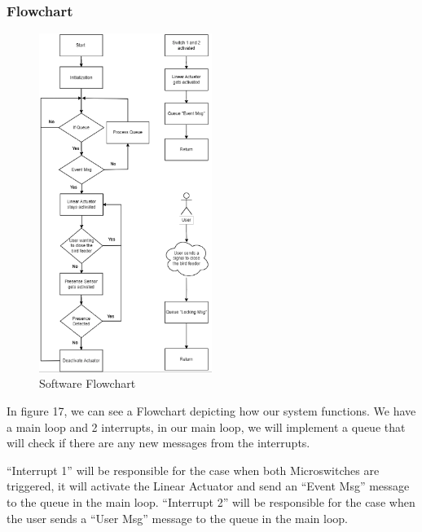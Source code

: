 \documentclass[12pt,a4paper]{article}
\begin{document}
\subsubsection{Flowchart}

\begin{figure}[h]
    \centering
    \includegraphics[width=0.5\textwidth]{images/flowchart.png}
    \caption{Software Flowchart}
\end{figure}

In figure 17, we can see a Flowchart depicting how our system functions. We have a main loop and 2 interrupts, in our main loop, we will implement a queue that will check if there are any new messages from the interrupts.  

“Interrupt 1” will be responsible for the case when both Microswitches are triggered, it will activate the Linear Actuator and send an “Event Msg” message to the queue in the main loop. “Interrupt 2” will be responsible for the case when the user sends a “User Msg” message to the queue in the main loop.  
\end{document}
